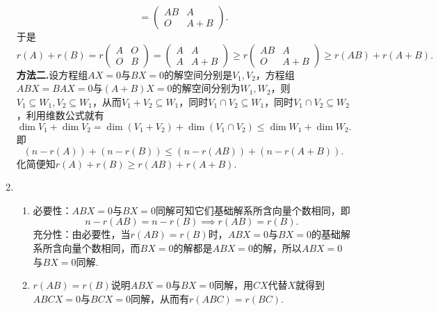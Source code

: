 \begin{enumerate}
\begin{equation*}
            =
            \begin{pmatrix}
                AB & A \\
                O & A+B
            \end{pmatrix}.
        \end{equation*}
        于是
        \begin{equation*}
            r(A)+r(B)=r
            \begin{pmatrix}
                A & O \\
                O & B
            \end{pmatrix}=
            \begin{pmatrix}
                A & A \\
                A & A+B
            \end{pmatrix}\geqslant r
            \begin{pmatrix}
                AB & A \\
                O & A+B
            \end{pmatrix}\geqslant
            r(AB)+r(A+B).
        \end{equation*}
        \textbf{方法二.}设方程组$AX=0$与$BX=0$的解空间分别是$V_1, V_2$，方程组$ABX=BAX=0$与$(A+B)X=0$的解空间分别为$W_1, W_2$，则$V_1\subseteq W_1, V_2\subseteq W_1$，从而$V_1+V_2\subseteq W_1$，同时$V_1\cap V_2\subseteq W_1$，同时$V_1\cap V_2\subseteq W_2$，利用维数公式就有
        \begin{equation*}
            \dim V_1+\dim V_2=\dim(V_1+V_2)+\dim(V_1\cap V_2)\leqslant \dim W_1+\dim W_2.
        \end{equation*}
        即
        \begin{equation*}
            (n-r(A))+(n-r(B))\leqslant (n-r(AB))+(n-r(A+B)).
        \end{equation*}
        化简便知$r(A)+r(B)\geqslant r(AB)+r(A+B)$.
    \item
        \begin{enumerate}
            \item
                必要性：$ABX=0$与$BX=0$同解可知它们基础解系所含向量个数相同，即
                \begin{equation*}
                    n-r(AB)=n-r(B)\implies r(AB)=r(B).
                \end{equation*}
                充分性：由必要性，当$r(AB)=r(B)$时，$ABX=0$与$BX=0$的基础解系所含向量个数相同，而$BX=0$的解都是$ABX=0$的解，所以$ABX=0$与$BX=0$同解.
            \item
                $r(AB)=r(B)$说明$ABX=0$与$BX=0$同解，用$CX$代替$X$就得到$ABCX=0$与$BCX=0$同解，从而有$r(ABC)=r(BC)$.\\

\end{enumerate}
\end{enumerate}
